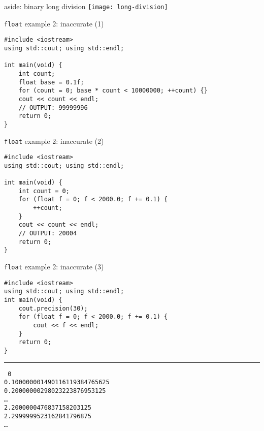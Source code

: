 \begin{frame}{aside: binary long division}
    \texttt{[image: long-division]}
\end{frame}


\begin{frame}[fragile,label=floatEx2In1]{\texttt{float} example 2: inaccurate (1)}
\lstset{
    language=C++,
    style=smaller
}
\begin{lstlisting}
#include <iostream>
using std::cout; using std::endl;

int main(void) {
    int count;
    float base = 0.1f;
    for (count = 0; base * count < 10000000; ++count) {}
    cout << count << endl;
    // OUTPUT: 99999996
    return 0;
}
\end{lstlisting}
\end{frame}

\begin{frame}[fragile,label=floatEx2In2]{\texttt{float} example 2: inaccurate (2)}
\lstset{
    language=C++,
    style=smaller
}
\begin{lstlisting}
#include <iostream>
using std::cout; using std::endl;

int main(void) {
    int count = 0;
    for (float f = 0; f < 2000.0; f += 0.1) {
        ++count;
    }
    cout << count << endl;
    // OUTPUT: 20004
    return 0;
}
\end{lstlisting}
\end{frame}

\begin{frame}[fragile,label=floatEx2In3]{\texttt{float} example 2: inaccurate (3)}
\lstset{
    language=C++,
    style=smaller
}
\begin{lstlisting}
#include <iostream>
using std::cout; using std::endl;
int main(void) {
    cout.precision(30);
    for (float f = 0; f < 2000.0; f += 0.1) {
        cout << f << endl;
    }
    return 0;
}
\end{lstlisting}
\hrule
\small\tt
0 \\
0.100000001490116119384765625 \\
0.20000000298023223876953125 \\
\ldots \\
2.2000000476837158203125 \\
2.2999999523162841796875 \\
\ldots
\end{frame}


